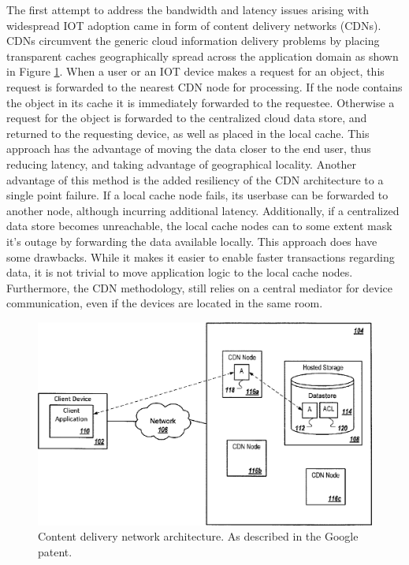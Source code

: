 The first attempt to address the bandwidth and latency issues arising with widespread IOT adoption came in form of content delivery networks (CDNs).\cite{gagliardi2011content}
CDNs circumvent the generic cloud information delivery problems by placing transparent caches geographically spread across the application domain as shown in Figure \ref{lit:fig:2}.
When a user or an IOT device makes a request for an object, this request is forwarded to the nearest CDN node for processing.
If the node contains the object in its cache it is immediately forwarded to the requestee.
Otherwise a request for the object is forwarded to the centralized cloud data store, and returned to the requesting device, as well as placed in the local cache.
This approach has the advantage of moving the data closer to the end user, thus reducing latency, and taking advantage of geographical locality.
Another advantage of this method is the added resiliency of the CDN architecture to a single point failure.
If a local cache node fails, its userbase can be forwarded to another node, although incurring additional latency.
Additionally, if a centralized data store becomes unreachable, the local cache nodes can to some extent mask it's outage by forwarding the data available locally.
This approach does have some drawbacks.
While it makes it easier to enable faster transactions regarding data, it is not trivial to move application logic to the local cache nodes.
Furthermore, the CDN methodology, still relies on a central mediator for device communication, even if the devices are located in the same room.

\begin{figure}[h]
    \centering
    \includegraphics[width=0.6\linewidth]{img/cdn.png}
    \caption{Content delivery network architecture.
    As described in the Google patent.\cite{gagliardi2011content}}
    \label{lit:fig:2}
\end{figure}

